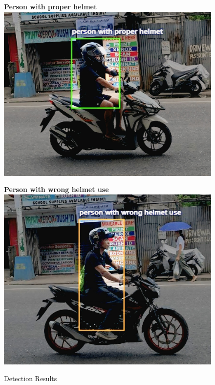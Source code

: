 \begin{refsection}
\begin{figure}[H]
\begin{minipage}{0.45\textwidth}
\centering
\textbf{Person with proper helmet} \\
\includegraphics[width=\linewidth]{figures/Fig 19d.jpg}
\end{minipage}\hfill
\begin{minipage}{0.45\textwidth}
\centering
\textbf{Person with wrong helmet use} \\
\includegraphics[width=\linewidth]{figures/Fig 19e.jpg}
\end{minipage}

\caption{Detection Results}
\label{fig:dataset_examples}
\end{figure}


\end{refsection}
